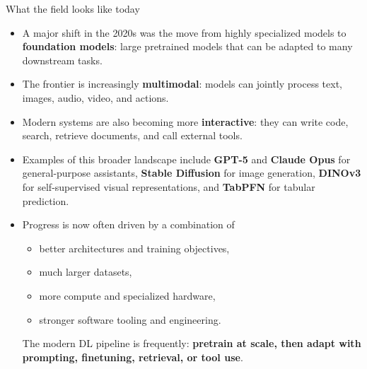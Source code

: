 \documentclass[11pt,compress,t,notes=noshow, xcolor=table]{beamer}
\begin{document}
\begin{vbframe}{What the field looks like today}
\vspace{.2cm}
\begin{itemize}
  \item A major shift in the 2020s was the move from highly specialized models to \textbf{foundation models}: large pretrained models that can be adapted to many downstream tasks.
\vspace{.1cm}
\item The frontier is increasingly \textbf{multimodal}: models can jointly process text, images, audio, video, and actions.
\vspace{.1cm}
\item Modern systems are also becoming more \textbf{interactive}: they can write code, search, retrieve documents, and call external tools.
\vspace{.1cm}
\item Examples of this broader landscape include \textbf{GPT-5} and \textbf{Claude Opus} for general-purpose assistants, \textbf{Stable Diffusion} for image generation, \textbf{DINOv3} for self-supervised visual representations, and \textbf{TabPFN} for tabular prediction.
\framebreak
\item Progress is now often driven by a combination of
\tiny
\begin{itemize}
\item better architectures and training objectives,
\item much larger datasets,
\item more compute and specialized hardware,
\item stronger software tooling and engineering.
\end{itemize}
\small
The modern DL pipeline is frequently: \textbf{pretrain at scale, then adapt with prompting, finetuning, retrieval, or tool use}.
\end{itemize}
\end{vbframe}

\endlecture
\end{document}
